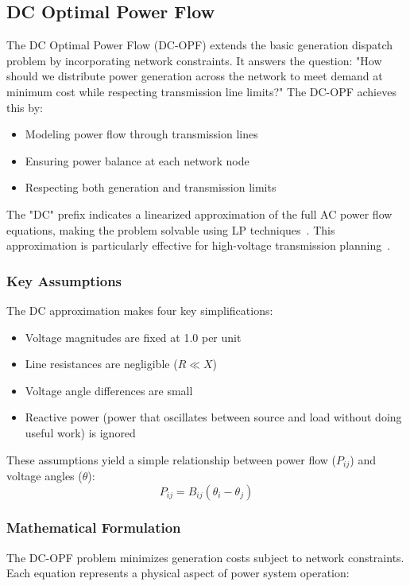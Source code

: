 \subsection{DC Optimal Power Flow}
The DC Optimal Power Flow (DC-OPF) extends the basic generation dispatch problem by incorporating network constraints.
It answers the question: "How should we distribute power generation across the network to meet demand
at minimum cost while respecting transmission line limits?" The DC-OPF achieves this by:
\begin{itemize}
    \item Modeling power flow through transmission lines
    \item Ensuring power balance at each network node
    \item Respecting both generation and transmission limits
\end{itemize}

The "DC" prefix indicates a linearized approximation of the full AC power flow equations, making the problem
 solvable using LP techniques~\cite{wood2013power}. This approximation is particularly effective for 
 high-voltage transmission planning~\cite{andersson2004power}.

\subsubsection{Key Assumptions}
The DC approximation makes four key simplifications:
\begin{itemize}
    \item Voltage magnitudes are fixed at 1.0 per unit
    \item Line resistances are negligible ($R \ll X$)
    \item Voltage angle differences are small
    \item Reactive power (power that oscillates between source and load without doing useful work) is ignored
\end{itemize}

These assumptions yield a simple relationship between power flow ($P_{ij}$) and voltage angles ($\theta$):
\begin{equation}
    P_{ij} = B_{ij}(\theta_i - \theta_j)
\end{equation}

\subsubsection{Mathematical Formulation}
The DC-OPF problem minimizes generation costs subject to network constraints. Each equation represents a 
physical aspect of power system operation:

